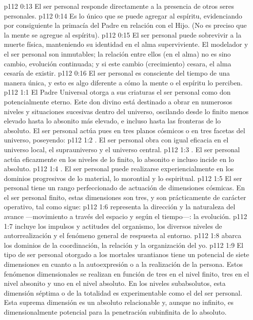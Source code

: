 \vs p112 0:13 El ser personal responde directamente a la presencia de otros seres personales.
\vs p112 0:14 Es lo único que se puede agregar al espíritu, evidenciando por consiguiente la primacía del Padre en relación con el Hijo. (No es preciso que la mente se agregue al espíritu).
\vs p112 0:15 El ser personal puede sobrevivir a la muerte física, manteniendo su identidad en el alma superviviente. El modelador y el ser personal son inmutables; la relación entre ellos (en el alma) no es sino cambio, evolución continuada; y si este cambio (crecimiento) cesara, el alma cesaría de existir.
\vs p112 0:16 El ser personal es consciente del tiempo de una manera única, y esto es algo diferente a cómo la mente o el espíritu lo perciben.
\vs p112 1:1 El Padre Universal otorga a sus criaturas el ser personal como don potencialmente eterno. Este don divino está destinado a obrar en numerosos niveles y situaciones sucesivas dentro del universo, oscilando desde lo finito menos elevado hasta lo absonito más elevado, e incluso hasta las fronteras de lo absoluto. El ser personal actúa pues en tres planos cósmicos o en tres facetas del universo, poseyendo:
\vs p112 1:2 . El ser personal obra con igual eficacia en el universo local, el suprauniverso y el universo central.
\vs p112 1:3 . El ser personal actúa eficazmente en los niveles de lo finito, lo absonito e incluso incide en lo absoluto.
\vs p112 1:4 . El ser personal puede realizarse experiencialmente en los dominios progresivos de lo material, lo morontial y lo espiritual.
\vs p112 1:5 \pc El ser personal tiene un rango perfeccionado de actuación de dimensiones cósmicas. En el ser personal finito, estas dimensiones son tres, y son prácticamente de carácter operativo, tal como sigue:
\vs p112 1:6  representa la dirección y la naturaleza del avance ---movimiento a través del espacio y según el tiempo---: la evolución.
\vs p112 1:7  incluye los impulsos y actitudes del organismo, los diversos niveles de autorrealización y el fenómeno general de respuesta al entorno.
\vs p112 1:8  abarca los dominios de la coordinación, la relación y la organización del yo.
\vs p112 1:9 \pc El tipo de ser personal otorgado a los mortales urantianos tiene un potencial de siete dimensiones en cuanto a la autoexpresión o a la realización de la persona. Estos fenómenos dimensionales se realizan en función de tres en el nivel finito, tres en el nivel absonito y uno en el nivel absoluto. En los niveles subabsolutos, esta dimensión séptima o de la totalidad es experimentable como el  del ser personal. Esta suprema dimensión es un absoluto relacionable y, aunque no infinito, es dimensionalmente potencial para la penetración subinfinita de lo absoluto.
